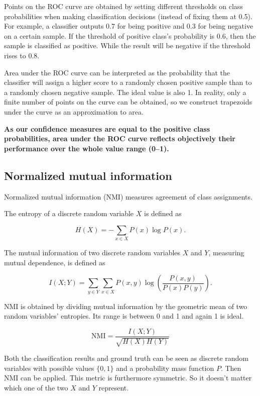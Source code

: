 \documentclass[11pt,a4paper]{report}
\begin{document}
Points on the ROC curve are obtained by setting different thresholds on class probabilities when making classification decisions (instead of fixing them at 0.5).
For example, a classifier outputs 0.7 for being positive and 0.3 for being negative on a certain sample.
If the threshold of positive class's probability is 0.6, then the sample is classified as positive.
While the result will be negative if the threshold rises to 0.8.

Area under the ROC curve can be interpreted as the probability that the classifier will assign a higher score to a randomly chosen positive sample than to a randomly chosen negative sample.
The ideal value is also 1.
In reality, only a finite number of points on the curve can be obtained, so we construct trapezoids under the curve as an approximation to area.

\textbf{As our confidence measures are equal to the positive class probabilities, area under the ROC curve reflects objectively their performance over the whole value range (\numrange{0}{1}).}

\subsection{Normalized mutual information}

Normalized mutual information (NMI) measures agreement of class assignments.

The entropy of a discrete random variable \(X\) is defined as

\begin{equation*}
  H(X) = - \sum_{x \in X} P(x) \log P(x).
\end{equation*}

The mutual information of two discrete random variables \(X\) and \(Y\), measuring mutual dependence, is defined as

\begin{equation*}
  I(X;Y) = \sum_{y \in Y} \sum_{x \in X} P(x,y) \log \left(\frac{P(x,y)}{P(x)P(y)}\right).
\end{equation*}

NMI is obtained by dividing mutual information by the geometric mean of two random variables' entropies.
Its range is between 0 and 1 and again 1 is ideal.

\begin{equation*}
  \mathrm{NMI} = \frac{I(X;Y)}{\sqrt{H(X)H(Y)}}
\end{equation*}

Both the classification results and ground truth can be seen as discrete random variables with possible values \(\lbrace 0,1 \rbrace\) and a probability mass function \(P\).
Then NMI can be applied.
This metric is furthermore symmetric.
So it doesn't matter which one of the two \(X\) and \(Y\) represent.
\end{document}

